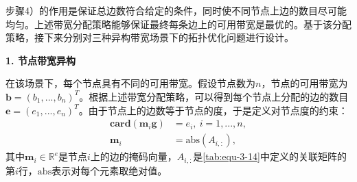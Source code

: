 步骤4）的作用是保证总边数符合给定的条件，同时使不同节点上边的数目尽可能均匀。上述带宽分配策略能够保证最终每条边上的可用带宽是最优的。基于该分配策略，接下来分别对三种异构带宽场景下的拓扑优化问题进行设计。

\textbf{1. 节点带宽异构}

在该场景下，每个节点具有不同的可用带宽。假设节点数为$n$，节点的可用带宽为$\boldsymbol{b}=\left( b_1,...,b_n \right)^T$。根据上述带宽分配策略，可以得到每个节点上分配的边的数目$\boldsymbol{e}=\left( e_1,...,e_n \right)^T$。由于节点上的边数等于节点的度，于是定义对节点度的约束：
\begin{equation}
    \begin{aligned}
    \label{tab:equ-3-23}
    \mathbf{card}\left( \boldsymbol{m}_i\mathbf{g} \right) &=e_i,\ i=1,...,n,
    \\
    \boldsymbol{m}_i&=\mathrm{abs}\left( A_{i,:} \right) ,
    \end{aligned}
\end{equation}
其中$\boldsymbol{m}_i\in \mathbb{R} ^{e}$是节点$i$上的边的掩码向量，$A_{i,:}$是\autoref{tab:equ-3-14}中定义的关联矩阵的第$i$行，$\mathrm{abs}$表示对每个元素取绝对值。

